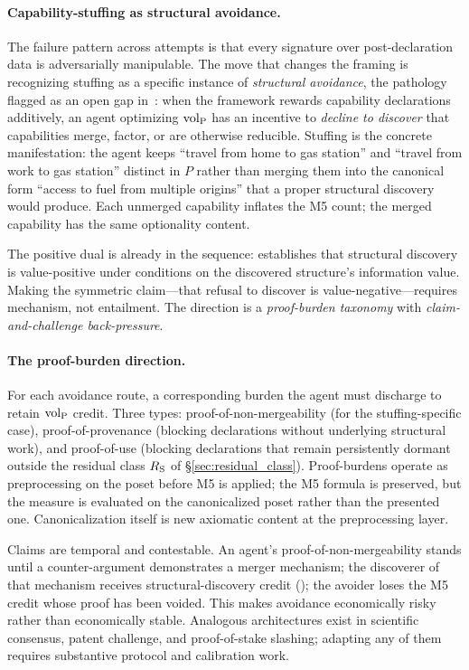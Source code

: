 \paragraph{Capability-stuffing as structural avoidance.}
The failure pattern across attempts is that every signature over
post-declaration data is adversarially manipulable.  The move
that changes the framing is recognizing stuffing as a specific
instance of \emph{structural avoidance}, the pathology flagged
as an open gap in~\citep[Discussion]{lasser2026poset}: when the
framework rewards capability declarations additively, an agent
optimizing ${\operatorname{vol}_{\mathrm{P}}}$ has an incentive to \emph{decline to discover}
that capabilities merge, factor, or are otherwise reducible.
Stuffing is the concrete manifestation: the agent keeps
``travel from home to gas station'' and ``travel from work to
gas station'' distinct in $P$ rather than merging them into the
canonical form ``access to fuel from multiple origins'' that a
proper structural discovery would produce.  Each unmerged
capability inflates the M5 count; the merged capability has the
same optionality content.

The positive dual is already in the sequence:
\citep[Proposition~2]{lasser2026horizon} establishes that
structural discovery is value-positive under conditions on the
discovered structure's information value.  Making the symmetric
claim---that refusal to discover is value-negative---requires
mechanism, not entailment.  The direction is a \emph{proof-burden
taxonomy} with \emph{claim-and-challenge back-pressure}.

\paragraph{The proof-burden direction.}
For each avoidance route, a corresponding burden the agent must
discharge to retain ${\operatorname{vol}_{\mathrm{P}}}$ credit.  Three types:
proof-of-non-mergeability (for the stuffing-specific case),
proof-of-provenance (blocking declarations without underlying
structural work), and proof-of-use (blocking declarations that
remain persistently dormant outside the residual class $R_{\mathrm{S}}$
of \S\ref{sec:residual_class}).  Proof-burdens operate as
preprocessing on the poset before M5 is applied; the M5 formula
is preserved, but the measure is evaluated on the canonicalized
poset rather than the presented one.  Canonicalization itself is
new axiomatic content at the preprocessing layer.

Claims are temporal and contestable.  An agent's
proof-of-non-mergeability stands until a counter-argument
demonstrates a merger mechanism; the discoverer of that
mechanism receives structural-discovery credit
(\citep[Proposition~2]{lasser2026horizon}); the avoider loses
the M5 credit whose proof has been voided.  This makes avoidance
economically risky rather than economically stable.  Analogous
architectures exist in scientific consensus, patent challenge,
and proof-of-stake slashing; adapting any of them requires
substantive protocol and calibration work.

